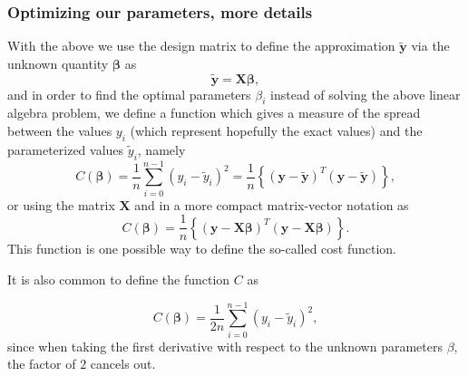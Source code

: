 \documentclass{beamer}
\begin{document}
\begin{frame}
\frametitle{Optimizing our parameters, more details}

\begin{block}{}
With the above we use the design matrix to define the approximation $\bm{\tilde{y}}$ via the unknown quantity $\bm{\beta}$ as
\[
\bm{\tilde{y}}= \bm{X}\bm{\beta},
\]
and in order to find the optimal parameters $\beta_i$ instead of solving the above linear algebra problem, we define a function which gives a measure of the spread between the values $y_i$ (which represent hopefully the exact values) and the parameterized values $\tilde{y}_i$, namely
\[
C(\bm{\beta})=\frac{1}{n}\sum_{i=0}^{n-1}\left(y_i-\tilde{y}_i\right)^2=\frac{1}{n}\left\{\left(\bm{y}-\bm{\tilde{y}}\right)^T\left(\bm{y}-\bm{\tilde{y}}\right)\right\},
\]
or using the matrix $\bm{X}$ and in a more compact matrix-vector notation as
\[
C(\bm{\beta})=\frac{1}{n}\left\{\left(\bm{y}-\bm{X}\bm{\beta}\right)^T\left(\bm{y}-\bm{X}\bm{\beta}\right)\right\}.
\]
This function is one possible way to define the so-called cost function.

It is also common to define
the function $C$ as

\[
C(\bm{\beta})=\frac{1}{2n}\sum_{i=0}^{n-1}\left(y_i-\tilde{y}_i\right)^2,
\]
since when taking the first derivative with respect to the unknown parameters $\beta$, the factor of $2$ cancels out. 
\end{block}
\end{frame}
\end{document}
